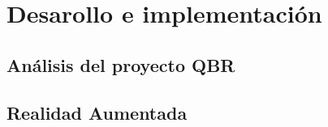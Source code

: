 \chapter{Desarollo e implementación}

\section{Análisis del proyecto QBR}

\section{Realidad Aumentada}
